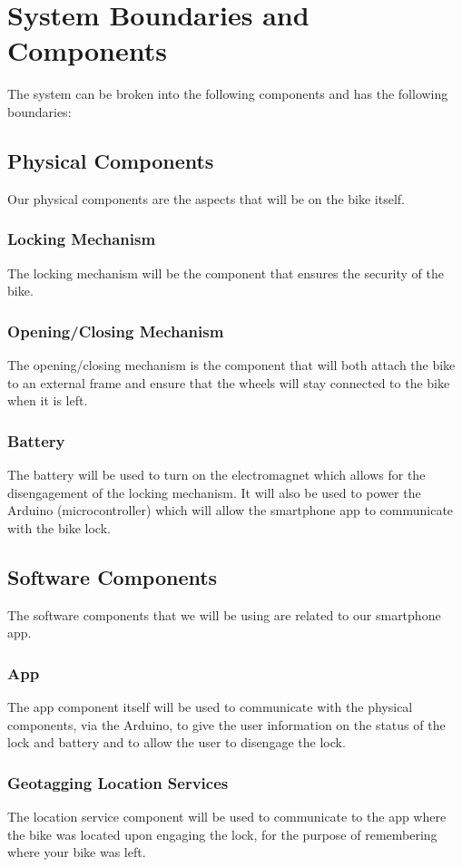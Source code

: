 \documentclass{article}
\begin{document}
\section{System Boundaries and Components}
The system can be broken into the following components and has the following boundaries:
\subsection {Physical Components}
Our physical components are the aspects that will be on the bike itself.
\subsubsection{Locking Mechanism}
The locking mechanism will be the component that ensures the security of the bike.
\subsubsection{Opening/Closing Mechanism}
The opening/closing mechanism is the component that will both attach the bike to an external frame and ensure that the wheels will stay connected to the bike when it is left.
\subsubsection{Battery}
The battery will be used to turn on the electromagnet which allows for the disengagement of the locking mechanism.  It will also be used to power the Arduino (microcontroller) which will allow the smartphone app to communicate with the bike lock.
\subsection {Software Components}
The software components that we will be using are related to our smartphone app.
\subsubsection {App}
The app component itself will be used to communicate with the physical components, via the Arduino, to give the user information on the status of the lock and battery and to allow the user to disengage the lock. 
\subsubsection {Geotagging Location Services}
The location service component will be used to communicate to the app where the bike was located upon engaging the lock, for the purpose of remembering where your bike was left.
\end{document}
